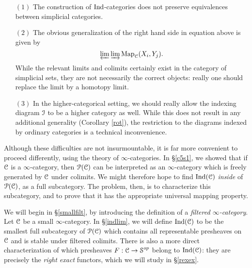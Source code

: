 \begin{itemize}
\item[$(1)$] The construction of $\operatorname{Ind}$-categories does not preserve equivalences between simplicial categories.

\item[$(2)$] The obvious generalization of the right hand side in equation above is given by
$$ \varprojlim \operatorname{\varinjlim} \operatorname{{Map}}_{\operatorname{\mathcal{C}}}(X_i,Y_j).$$
While the relevant limits and colimits certainly exist in the category of simplicial sets, they
are not necessarily the correct objects: really one should replace the limit by a homotopy limit.

\item[$(3)$] In the higher-categorical setting, we should really allow the indexing diagram $\operatorname{\mathcal{I}}$
to be a higher category as well. While this does not result in any additional generality (Corollary \ref{rot}), the restriction to the diagrams indexed by ordinary categories is a technical inconvenience.
\end{itemize}

Although these difficulties are not insurmountable, it is far more convenient to proceed differently, using the theory of $\infty$-categories. In \S \ref{c5s1}, we showed that if $\operatorname{\mathcal{C}}$ is a $\infty$-category, then $\operatorname{\mathcal{P}}(\operatorname{\mathcal{C}})$ can be interpreted as an $\infty$-category which is freely generated by $\operatorname{\mathcal{C}}$ under colimits. We might therefore hope to find $\operatorname{Ind}(\operatorname{\mathcal{C}})$ {\it inside} of $\operatorname{\mathcal{P}}(\operatorname{\mathcal{C}})$, as a full subcategory. The problem, then, is to characterize this subcategory, and to prove that it has the appropriate universal mapping property.

We will begin in \S \ref{smallfilt}, by introducing the definition of a {\em filtered $\infty$-category}.
Let $\operatorname{\mathcal{C}}$ be a small $\infty$-category. In \S \ref{indlim}, we will define $\operatorname{Ind}(\operatorname{\mathcal{C}})$ to be the smallest full subcategory of $\operatorname{\mathcal{P}}(\operatorname{\mathcal{C}})$ which contains all representable presheaves on $\operatorname{\mathcal{C}}$ and is stable under filtered colimits. There is also a more direct characterization of which presheaves $F: \operatorname{\mathcal{C}} \rightarrow \operatorname{\mathcal{S}}^{op}$ belong to $\operatorname{Ind}(\operatorname{\mathcal{C}})$: they are precisely the {\em right exact} functors, which we will study in \S \ref{rexex}.

